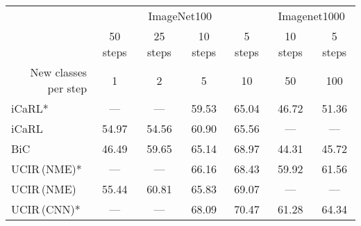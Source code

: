 \begin{table*}[t]
    \centering
    \begin{adjustbox}{max width=\textwidth}
        \begin{tabular}{@{}l|cccc|cc@{}}
            \toprule
                                                          & \multicolumn{4}{|c|}{ImageNet100} & \multicolumn{2}{c}{Imagenet1000}                                                                                                         \\
                                                          & 50 steps                          & 25 steps                         & 10 steps                         & 5 steps                          & 10 steps       & 5 steps        \\
            \multicolumn{1}{r|}{New classes per step}     & 1                                 & 2                                & 5                                & 10                               & 50             & 100            \\
            \midrule
            iCaRL* \cite{rebuffi2017icarl}                & ---                               & ---                              & 59.53                            & 65.04                            & 46.72          & 51.36          \\
            iCaRL                                         & 54.97                             & 54.56                            & 60.90                            & 65.56                            & ---            & ---            \\
            BiC \cite{wu2019bias_correction}              & 46.49                             & 59.65                            & 65.14                            & 68.97                            & 44.31          & 45.72          \\
            UCIR\,{\scriptsize (NME)}* \cite{hou2019ucir} & ---                               & ---                              & 66.16                            & 68.43                            & 59.92          & 61.56          \\
            UCIR\,{\scriptsize (NME)}                     & 55.44                             & 60.81                            & 65.83                            & 69.07                            & ---            & ---            \\
            UCIR\,{\scriptsize (CNN)}*                    & ---                               & ---                              & 68.09                            & 70.47                            & 61.28          & 64.34          \\

\end{tabular}
\end{adjustbox}
\end{table*}
